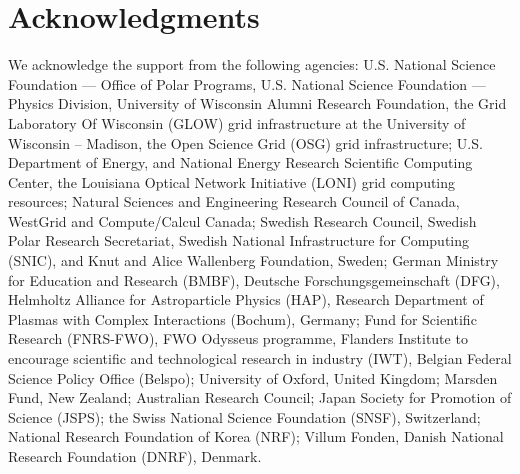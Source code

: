 \section{Acknowledgments}

We acknowledge the support from the following agencies: U.S. National
Science Foundation --- Office of Polar Programs, U.S. National Science
Foundation --- Physics Division, University of Wisconsin Alumni Research
Foundation, the Grid Laboratory Of Wisconsin (GLOW) grid infrastructure at
the University of Wisconsin -- Madison, the Open Science Grid (OSG) grid
infrastructure; U.S. Department of Energy, and National Energy Research
Scientific Computing Center, the Louisiana Optical Network Initiative
(LONI) grid computing resources; Natural Sciences and Engineering Research
Council of Canada, WestGrid and Compute/Calcul Canada; Swedish Research
Council, Swedish Polar Research Secretariat, Swedish National
Infrastructure for Computing (SNIC), and Knut and Alice Wallenberg
Foundation, Sweden; German Ministry for Education and Research (BMBF),
Deutsche Forschungsgemeinschaft (DFG), Helmholtz Alliance for Astroparticle
Physics (HAP), Research Department of Plasmas with Complex Interactions
(Bochum), Germany; Fund for Scientific Research (FNRS-FWO), FWO Odysseus
programme, Flanders Institute to encourage scientific and technological
research in industry (IWT), Belgian Federal Science Policy Office (Belspo);
University of Oxford, United Kingdom; Marsden Fund, New Zealand; Australian
Research Council; Japan Society for Promotion of Science (JSPS); the Swiss
National Science Foundation (SNSF), Switzerland; National Research
Foundation of Korea (NRF); Villum Fonden, Danish National Research
Foundation (DNRF), Denmark.

